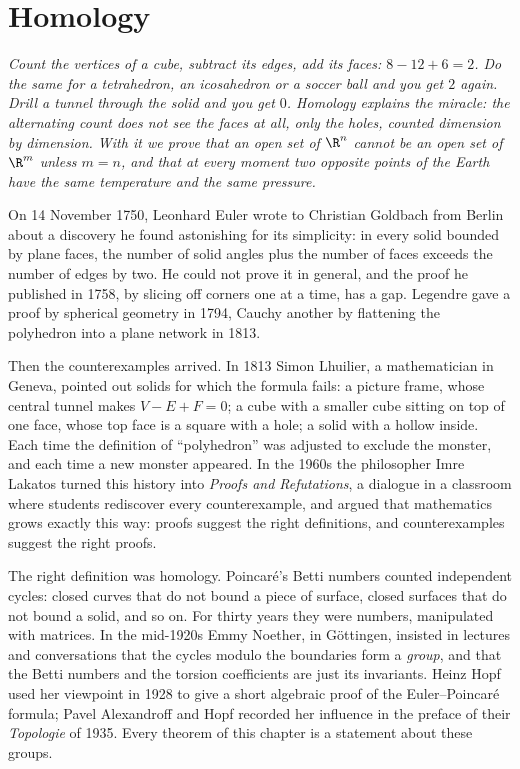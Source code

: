 \chapter{Homology}

\begin{center}\itshape
Count the vertices of a cube, subtract its edges, add its faces: $8-12+6=2$. Do the same for a tetrahedron, an icosahedron or a soccer ball and you get
$2$ again. Drill a tunnel through the solid and you get $0$. Homology explains the miracle: the alternating count does not see the faces at all, only the
holes, counted dimension by dimension. With it we prove that an open set of $\R^n$ cannot be an open set of $\R^m$ unless $m=n$, and that at every moment
two opposite points of the Earth have the same temperature and the same pressure.
\end{center}

On 14 November 1750, Leonhard Euler wrote to Christian Goldbach from Berlin about a discovery he found astonishing for its simplicity: in every solid
bounded by plane faces, the number of solid angles plus the number of faces exceeds the number of edges by two. He could not prove it in general, and
the proof he published in 1758, by slicing off corners one at a time, has a gap. Legendre gave a proof by spherical geometry in 1794, Cauchy another by
flattening the polyhedron into a plane network in 1813.

Then the counterexamples arrived. In 1813 Simon Lhuilier, a mathematician in Geneva, pointed out solids for which the formula fails: a picture frame,
whose central tunnel makes $V-E+F=0$; a cube with a smaller cube sitting on top of one face, whose top face is a square with a hole; a solid with a
hollow inside. Each time the definition of ``polyhedron'' was adjusted to exclude the monster, and each time a new monster appeared. In the 1960s the
philosopher Imre Lakatos turned this history into \emph{Proofs and Refutations}, a dialogue in a classroom where students rediscover every
counterexample, and argued that mathematics grows exactly this way: proofs suggest the right definitions, and counterexamples suggest the right proofs.

The right definition was homology. Poincar\'e's Betti numbers counted independent cycles: closed curves that do not bound a piece of surface, closed
surfaces that do not bound a solid, and so on. For thirty years they were numbers, manipulated with matrices. In the mid-1920s Emmy Noether, in
G\"ottingen, insisted in lectures and conversations that the cycles modulo the boundaries form a \emph{group}, and that the Betti numbers and the torsion
coefficients are just its invariants. Heinz Hopf used her viewpoint in 1928 to give a short algebraic proof of the Euler--Poincar\'e formula; Pavel
Alexandroff and Hopf recorded her influence in the preface of their \emph{Topologie} of 1935. Every theorem of this chapter is a statement about
these groups.

